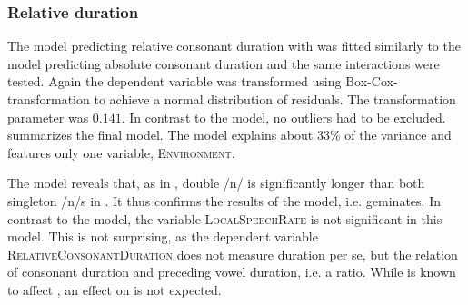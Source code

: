\subsubsection{Relative duration}


The model predicting relative consonant duration with  was fitted similarly to the model predicting absolute consonant duration and the same interactions were tested. Again the dependent variable was transformed using Box-Cox-transformation to achieve a normal distribution of residuals. The transformation parameter was $0.141$. In contrast to the  model, no outliers had to be excluded. 
  summarizes the final model. The model explains about 33\% of the variance and features only one variable, \textsc{Environment}.



\begin{table}
	\caption{ Summary of linear model for variables predicting the Box-Cox-transformed relative duration of [n] in prefixed words}
	\label{tbl: summary corpus un rel dur}
	
		
	
\end{table}



The model reveals that, as in , double /n/ is significantly longer than both singleton /n/s in . It thus confirms the results of the  model, i.e.  geminates. In contrast to the  model, the variable \textsc{LocalSpeechRate} is not significant in this model. This is not surprising, as the dependent variable \textsc{RelativeConsonantDuration} does not measure duration per se, but the relation of consonant duration and preceding vowel duration, i.e. a ratio. While  is known to affect , an effect on  is not expected. 

